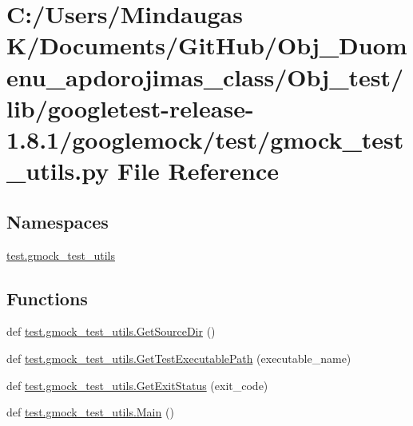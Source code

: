 \hypertarget{_obj__test_2lib_2googletest-release-1_88_81_2googlemock_2test_2gmock__test__utils_8py}{}\section{C\+:/\+Users/\+Mindaugas K/\+Documents/\+Git\+Hub/\+Obj\+\_\+\+Duomenu\+\_\+apdorojimas\+\_\+class/\+Obj\+\_\+test/lib/googletest-\/release-\/1.8.1/googlemock/test/gmock\+\_\+test\+\_\+utils.py File Reference}
\label{_obj__test_2lib_2googletest-release-1_88_81_2googlemock_2test_2gmock__test__utils_8py}
\subsection*{Namespaces}
\begin{DoxyCompactItemize}
\item 
 \mbox{\hyperlink{namespacetest_1_1gmock__test__utils}{test.\+gmock\+\_\+test\+\_\+utils}}
\end{DoxyCompactItemize}
\subsection*{Functions}
\begin{DoxyCompactItemize}
\item 
def \mbox{\hyperlink{namespacetest_1_1gmock__test__utils_a7d61daab1cfc01ded5e90e580cd70c51}{test.\+gmock\+\_\+test\+\_\+utils.\+Get\+Source\+Dir}} ()
\item 
def \mbox{\hyperlink{namespacetest_1_1gmock__test__utils_a2e91ced571e7f160fc151c2378d8f2f1}{test.\+gmock\+\_\+test\+\_\+utils.\+Get\+Test\+Executable\+Path}} (executable\+\_\+name)
\item 
def \mbox{\hyperlink{namespacetest_1_1gmock__test__utils_a3fbda6599ef677f59ded8d6a617ac1c7}{test.\+gmock\+\_\+test\+\_\+utils.\+Get\+Exit\+Status}} (exit\+\_\+code)
\item 
def \mbox{\hyperlink{namespacetest_1_1gmock__test__utils_ac34a409a19ef577ba2dc8bf8f5434a28}{test.\+gmock\+\_\+test\+\_\+utils.\+Main}} ()
\end{DoxyCompactItemize}
